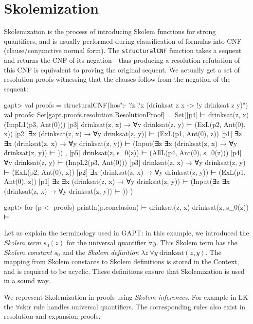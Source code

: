 \documentclass[a4paper,11pt]{book}
\begin{document}
\section{Skolemization}\label{secskolem}

Skolemization is the process of introducing Skolem functions for strong
quantifiers, and is usually performed during clausification of formulas into
CNF (clause/conjunctive normal form).  The \texttt{structuralCNF} function
takes a sequent and returns the CNF of its negation---thus producing a
resolution refutation of this CNF is equivalent to proving the original
sequent.  We actually get a set of resolution proofs witnessing that the
clauses follow from the negation of the sequent:
\begin{clilisting}
gapt> val proofs = structuralCNF(hos":- ?z ?x (drinksat z x -> !y drinksat z y)")
val proofs: Set[gapt.proofs.resolution.ResolutionProof] = Set([p4]  ⊢ drinksat(z, x)   (ImpL1(p3, Ant(0)))
[p3] drinksat(z, x) → ∀y drinksat(z, y) ⊢    (ExL(p2, Ant(0), x))
[p2] ∃x (drinksat(z, x) → ∀y drinksat(z, y)) ⊢    (ExL(p1, Ant(0), z))
[p1] ∃z ∃x (drinksat(z, x) → ∀y drinksat(z, y)) ⊢    (Input(∃z ∃x (drinksat(z, x) → ∀y drinksat(z, y)) ⊢ ))
, [p5] drinksat(z, s_0(z)) ⊢    (AllL(p4, Ant(0), s_0(z)))
[p4] ∀y drinksat(z, y) ⊢    (ImpL2(p3, Ant(0)))
[p3] drinksat(z, x) → ∀y drinksat(z, y) ⊢    (ExL(p2, Ant(0), x))
[p2] ∃x (drinksat(z, x) → ∀y drinksat(z, y)) ⊢    (ExL(p1, Ant(0), z))
[p1] ∃z ∃x (drinksat(z, x) → ∀y drinksat(z, y)) ⊢    (Input(∃z ∃x (drinksat(z, x) → ∀y drinksat(z, y)) ⊢ ))
)

gapt> for (p <- proofs) println(p.conclusion)
 ⊢ drinksat(z, x)
drinksat(z, s_0(z)) ⊢

\end{clilisting}

Let us explain the terminology used in GAPT: in this example, we introduced
the \emph{Skolem term} $s_0(z)$ for the universal quantifier $\forall y$.  This
Skolem term has the \emph{Skolem constant} $s_0$ and the \emph{Skolem
  definition} $\lambda z\: \forall y\; \mathrm{drinksat}(z,y)$.  The mapping from
Skolem constants to Skolem definitions is stored in the Context, and is
required to be acyclic.  These definitions ensure that Skolemization is used in
a sound way.

We represent Skolemization in proofs using \emph{Skolem inferences}.  For
example in LK the $\forall$sk:r rule handles universal quantifiers.  The
corresponding rules also exist in resolution and expansion proofs.
\begin{prooftree}
\end{prooftree}
\end{document}
